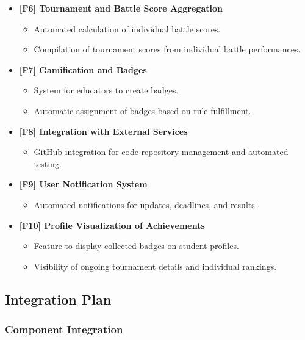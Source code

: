 \begin{itemize}
    \item \textbf{[F6] Tournament and Battle Score Aggregation}
    \begin{itemize}
        \item Automated calculation of individual battle scores.
        \item Compilation of tournament scores from individual battle performances.
    \end{itemize}

    \item \textbf{[F7] Gamification and Badges}
    \begin{itemize}
        \item System for educators to create badges.
        \item Automatic assignment of badges based on rule fulfillment.
    \end{itemize}

    \item \textbf{[F8] Integration with External Services}
    \begin{itemize}
        \item GitHub integration for code repository management and automated testing.
    \end{itemize}

    \item \textbf{[F9] User Notification System}
    \begin{itemize}
        \item Automated notifications for updates, deadlines, and results.
    \end{itemize}

    \item \textbf{[F10] Profile Visualization of Achievements}
    \begin{itemize}
        \item Feature to display collected badges on student profiles.
        \item Visibility of ongoing tournament details and individual rankings.
    \end{itemize}
\end{itemize}




\subsection{Integration Plan}
\subsubsection{Component Integration}

